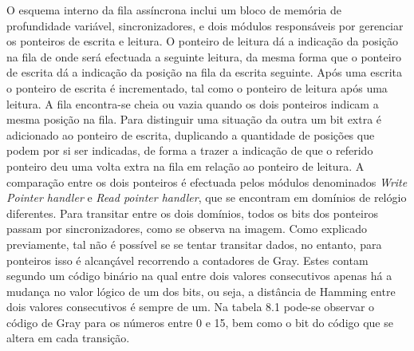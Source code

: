 O esquema interno da fila assíncrona inclui um bloco de memória de profundidade variável, sincronizadores, e dois módulos responsáveis por gerenciar os ponteiros de escrita e leitura. O ponteiro de leitura dá a indicação da posição na fila de onde será efectuada a seguinte leitura, da mesma forma que o ponteiro de escrita dá a indicação da posição na fila da escrita seguinte. Após uma escrita o ponteiro de escrita é incrementado, tal como o ponteiro de leitura após uma leitura. A fila encontra-se cheia ou vazia quando os dois ponteiros indicam a mesma posição na fila. Para distinguir uma situação da outra um bit extra é adicionado ao ponteiro de escrita, duplicando a quantidade de posições que podem por si ser indicadas, de forma a trazer a indicação de que o referido ponteiro deu uma volta extra na fila em relação ao ponteiro de leitura. A comparação entre os dois ponteiros é efectuada pelos módulos denominados \textit{Write Pointer handler} e \textit{Read pointer handler}, que se encontram em domínios de relógio diferentes. Para transitar entre os dois domínios, todos os bits dos ponteiros passam por sincronizadores, como se observa na imagem. Como explicado previamente, tal não é possível se se tentar transitar dados, no entanto, para ponteiros isso é alcançável recorrendo a contadores de Gray. Estes contam segundo um código binário na qual entre dois valores consecutivos apenas há a mudança no valor lógico de um dos bits, ou seja, a distância de Hamming entre dois valores consecutivos é sempre de um. Na tabela 8.1 pode-se observar o código de Gray para os números entre 0 e 15, bem como o bit do código que se altera em cada transição. 

